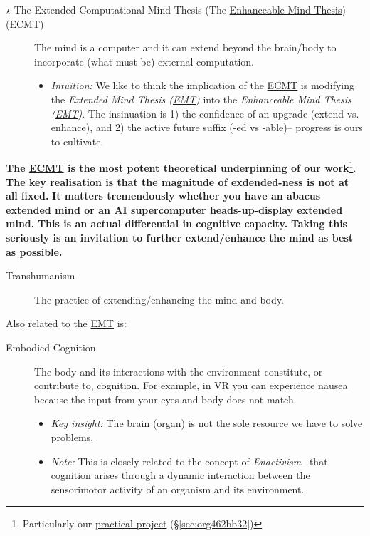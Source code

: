 \documentclass[logo,bsc,singlespacing,parskip]{infthesis}
\begin{document}
{\begin{mdframed}
\begin{description}
\item[{\(\star\) The Extended Computational Mind Thesis (The \hyperref[org1baa655]{Enhanceable Mind Thesis}) (\label{orgd2dc6a4}ECMT)}] The mind is a computer and it can extend beyond the brain/body to incorporate (what must be) external computation.
\begin{itemize}
\item \emph{Intuition:} We like to think the implication of the \hyperref[orgd2dc6a4]{ECMT} is modifying the \emph{Extended Mind Thesis (\hyperref[orgb24156b]{EMT})} into the \emph{\label{org1baa655}Enhanceable Mind Thesis (\hyperref[orgb24156b]{EMT})}.
The insinuation is 1) the confidence of an upgrade (extend vs. enhance), and 2) the active future suffix (-ed vs -able)-- progress is ours to cultivate.
\end{itemize}
\end{description}
\end{mdframed}

\textbf{The \hyperref[orgd2dc6a4]{ECMT} is the most potent theoretical underpinning of our work}\footnote{Particularly our \hyperref[sec:org462bb32]{practical project} (\S \ref{sec:org462bb32})}.
\textbf{The key realisation is that the magnitude of exdended-ness is not at all fixed.}
\textbf{It matters tremendously whether you have an abacus extended mind or an AI supercomputer heads-up-display extended mind.}
\textbf{This is an actual differential in cognitive capacity.}
\textbf{Taking this seriously is an invitation to further extend/enhance the mind as best as possible.}

\begin{mdframed}
\begin{description}
\item[{\label{org7147a42}Transhumanism}] The practice of extending/enhancing the mind and body.
\end{description}
\end{mdframed}

Also related to the \hyperref[orgb24156b]{EMT} is:

\begin{mdframed}
\begin{description}
\item[{\label{orgcc8d0dd}Embodied Cognition}] The body and its interactions with the environment constitute, or contribute to, cognition.
For example, in VR you can experience nausea because the input from your eyes and body does not match.
\begin{itemize}
\item \emph{Key insight:} The brain (organ) is not the sole resource we have to solve problems.
\item \emph{Note:} This is closely related to the concept of \emph{Enactivism}-- that cognition arises through a dynamic interaction between the sensorimotor activity of an organism and its environment.
\end{itemize}
\end{description}
\end{mdframed}

}
\end{document}
